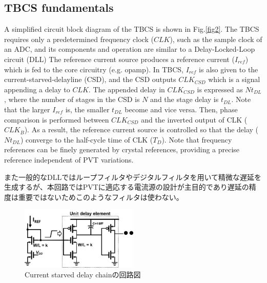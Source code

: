\documentclass[letterpaper, 10 pt, conference]{ieeeconf}  %
\begin{document}
\subsection{TBCS fundamentals}
A simplified circuit block diagram of the TBCS is shown in Fig.\ref{fig2}. The TBCS requires only a  predetermined frequency clock ($CLK$), such as the sample clock of an ADC, and its components and operation are similar to a Delay-Locked-Loop circuit (DLL) \cite{ sidiropoulos1997semidigital, lee19942, razavi2018delay} The reference current source produces a reference current ($I_{ref}$) which is fed to the core circuitry (e.g. opamp). In TBCS, $I_{ref}$ is also given to the current-starved-delayline (CSD), and the CSD outputs $CLK_{CSD}$ which is a signal appending a delay to $CLK$. The appended delay in $CLK_{CSD}$ is expressed as $Nt_{DL}$, where the number of stages in the CSD is $N$ and the stage delay is $t_{DL}$. Note that the larger $I_{ref}$ is, the smaller $t_{DL}$ become and vice versa. Then, phase comparison is performed between $CLK_{CSD}$ and the inverted output of CLK ($CLK_B$). As a result, the reference current source is controlled so that the delay ($Nt_{DL}$) converge to the half-cycle time of CLK ($T_D$). Note that frequency references can be finely generated by crystal references, providing a precise reference independent of PVT variations.

また一般的なDLLではループフィルタ\cite{sidiropoulos1997semidigital}やデジタルフィルタ\cite{kim20172}を用いて精微な遅延を生成するが、本回路ではPVTに適応する電流源の設計が主目的であり遅延の精度は重要ではないためこのようなフィルタは使わない。

\begin{figure}[!]
\centering
 \includegraphics[width=0.5\textwidth]{figs/inv.png}
  \caption{Current starved delay chainの回路図}
\label{inv}
\end{figure}
\end{document}
